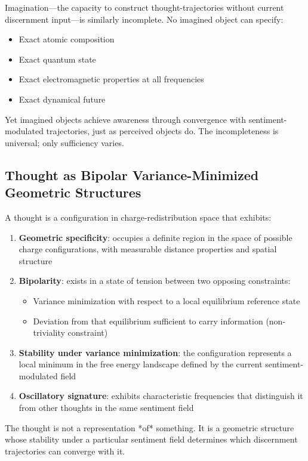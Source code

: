 \begin{corollary}
Imagination—the capacity to construct thought-trajectories without current discernment input—is similarly incomplete. No imagined object can specify:
\begin{itemize}
\item Exact atomic composition
\item Exact quantum state
\item Exact electromagnetic properties at all frequencies
\item Exact dynamical future
\end{itemize}

Yet imagined objects achieve awareness through convergence with sentiment-modulated trajectories, just as perceived objects do. The incompleteness is universal; only sufficiency varies.
\end{corollary}

\subsection{Thought as Bipolar Variance-Minimized Geometric Structures}

\begin{definition}
\label{def:bipolar-thought}
A thought is a configuration in charge-redistribution space that exhibits:

\begin{enumerate}[label=(\arabic*),leftmargin=*]
\item \textbf{Geometric specificity}: occupies a definite region in the space of possible charge configurations, with measurable distance properties and spatial structure

\item \textbf{Bipolarity}: exists in a state of tension between two opposing constraints:
\begin{itemize}
\item Variance minimization with respect to a local equilibrium reference state
\item Deviation from that equilibrium sufficient to carry information (non-triviality constraint)
\end{itemize}

\item \textbf{Stability under variance minimization}: the configuration represents a local minimum in the free energy landscape defined by the current sentiment-modulated field

\item \textbf{Oscillatory signature}: exhibits characteristic frequencies that distinguish it from other thoughts in the same sentiment field
\end{enumerate}

The thought is not a representation *of* something. It is a geometric structure whose stability under a particular sentiment field determines which discernment trajectories can converge with it.
\end{definition}

